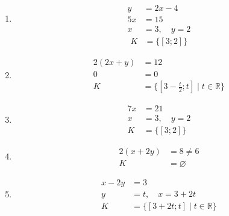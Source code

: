 \documentclass[11pt,a4paper]{article}
\begin{document}
\begin{zadaniReseniBox}[title={Domácí úkol}]
\begin{enumerate}[label=\alph*)]
\item
\[\begin{aligned}
y&=2x-4 \\
 5x&=15 \\
 x&=3,\quad y=2
\end{aligned}\]
\[\begin{aligned}K&=\{[3;2]\}\end{aligned}\]

\item
\[\begin{aligned}
2(2x+y)&=12 \\
 0&=0 \\
 K&=\{[3-\frac t2;t]\mid t\in\mathbb R\}
\end{aligned}\]

\item
\[\begin{aligned}
7x&=21\\x&=3,\quad y=2\\K&=\{[3;2]\}
\end{aligned}\]

\item
\[\begin{aligned}
2(x+2y)&=8\ne6\\K&=\varnothing
\end{aligned}\]

\item
\[\begin{aligned}
x-2y&=3\\y&=t,\quad x=3+2t\\K&=\{[3+2t;t]\mid t\in\mathbb R\}
\end{aligned}\]
\end{enumerate}
\end{zadaniReseniBox}


\end{document}
